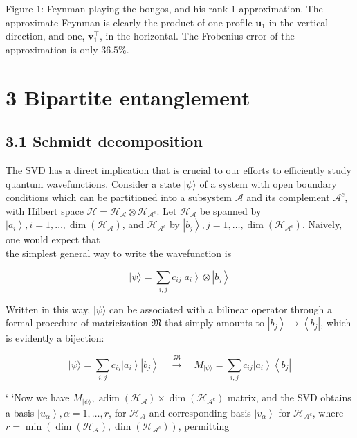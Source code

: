 \documentclass[12pt]{article}
\begin{document}
Figure 1: Feynman playing the bongos, and his rank-1 approximation. The approximate Feynman is clearly the product of one profile $\boldsymbol{u}_{1}$ in the vertical direction, and one, $\boldsymbol{v}_{1}^{\top}$, in the horizontal. The Frobenius error of the approximation is only $36.5 \%$.

\section*{3 Bipartite entanglement}
\subsection*{3.1 Schmidt decomposition}
The SVD has a direct implication that is crucial to our efforts to efficiently study quantum wavefunctions. Consider a state $|\psi\rangle$ of a system with open boundary conditions which can be partitioned into a subsystem $\mathcal{A}$ and its complement $\mathcal{A}^{c}$, with Hilbert space $\mathcal{H}=\mathcal{H}_{\mathcal{A}} \otimes \mathcal{H}_{\mathcal{A}^{c}}$. Let $\mathcal{H}_{\mathcal{A}}$ be spanned by $\left|a_{i}\right\rangle, i=1, \ldots, \operatorname{dim}\left(\mathcal{H}_{\mathcal{A}}\right)$, and $\mathcal{H}_{\mathcal{A}^{c}}$ by $\left|b_{j}\right\rangle, j=1, \ldots, \operatorname{dim}\left(\mathcal{H}_{\mathcal{A}^{c}}\right)$. Naively, one would expect that\\
the simplest general way to write the wavefunction is


\begin{equation*}
|\psi\rangle=\sum_{i, j} c_{i j}\left|a_{i}\right\rangle \otimes\left|b_{j}\right\rangle \tag{4}
\end{equation*}


Written in this way, $|\psi\rangle$ can be associated with a bilinear operator through a formal procedure of matricization $\mathfrak{M}$ that simply amounts to $\left|b_{j}\right\rangle \rightarrow\left\langle b_{j}\right|$, which is evidently a bijection:


\begin{equation*}
|\psi\rangle=\sum_{i, j} c_{i j}\left|a_{i}\right\rangle\left|b_{j}\right\rangle \quad \xrightarrow{\mathfrak{M}} \quad M_{|\psi\rangle}=\sum_{i, j} c_{i j}\left|a_{i}\right\rangle\left\langle b_{j}\right| \tag{5}
\end{equation*}


`   `Now we have $M_{|\psi\rangle}, \operatorname{adim}\left(\mathcal{H}_{\mathcal{A}}\right) \times \operatorname{dim}\left(\mathcal{H}_{\mathcal{A}^{c}}\right)$ matrix, and the SVD obtains a basis $\left|u_{\alpha}\right\rangle, \alpha=1, \ldots, r$, for $\mathcal{H}_{\mathcal{A}}$ and corresponding basis $\left|v_{\alpha}\right\rangle$ for $\mathcal{H}_{\mathcal{A}^{c}}$, where $r=\min \left(\operatorname{dim}\left(\mathcal{H}_{\mathcal{A}}\right), \operatorname{dim}\left(\mathcal{H}_{\mathcal{A}^{c}}\right)\right)$, permitting
\end{document}
